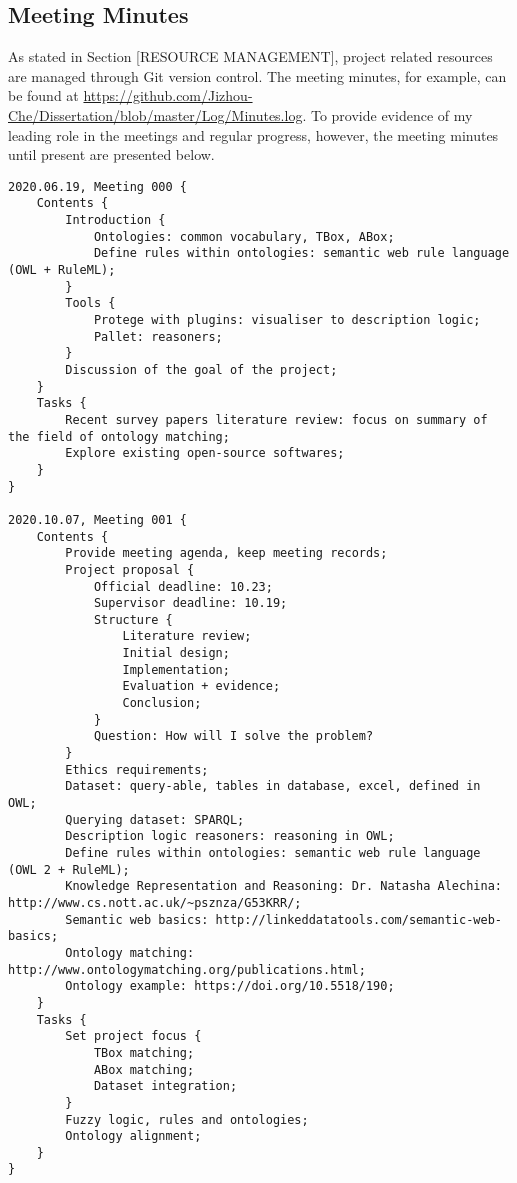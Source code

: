 \begin{appendices}


\chapter{Meeting Minutes}

As stated in Section [RESOURCE MANAGEMENT], project related resources are managed through Git version control. The meeting minutes, for example, can be found at \url{https://github.com/Jizhou-Che/Dissertation/blob/master/Log/Minutes.log}. To provide evidence of my leading role in the meetings and regular progress, however, the meeting minutes until present are presented below.
\\

\begin{spacing}{1.0}

\lstset{
basicstyle=\ttfamily\scriptsize,
showspaces=false,
showtabs=false,
breaklines,
tabsize=2
}

\begin{lstlisting}
2020.06.19, Meeting 000 {
	Contents {
		Introduction {
			Ontologies: common vocabulary, TBox, ABox;
			Define rules within ontologies: semantic web rule language (OWL + RuleML);
		}
		Tools {
			Protege with plugins: visualiser to description logic;
			Pallet: reasoners;
		}
		Discussion of the goal of the project;
	}
	Tasks {
		Recent survey papers literature review: focus on summary of the field of ontology matching;
		Explore existing open-source softwares;
	}
}

2020.10.07, Meeting 001 {
	Contents {
		Provide meeting agenda, keep meeting records;
		Project proposal {
			Official deadline: 10.23;
			Supervisor deadline: 10.19;
			Structure {
				Literature review;
				Initial design;
				Implementation;
				Evaluation + evidence;
				Conclusion;
			}
			Question: How will I solve the problem?
		}
		Ethics requirements;
		Dataset: query-able, tables in database, excel, defined in OWL;
		Querying dataset: SPARQL;
		Description logic reasoners: reasoning in OWL;
		Define rules within ontologies: semantic web rule language (OWL 2 + RuleML);
		Knowledge Representation and Reasoning: Dr. Natasha Alechina: http://www.cs.nott.ac.uk/~psznza/G53KRR/;
		Semantic web basics: http://linkeddatatools.com/semantic-web-basics;
		Ontology matching: http://www.ontologymatching.org/publications.html;
		Ontology example: https://doi.org/10.5518/190;
	}
	Tasks {
		Set project focus {
			TBox matching;
			ABox matching;
			Dataset integration;
		}
		Fuzzy logic, rules and ontologies;
		Ontology alignment;
	}
}


\end{lstlisting}
\end{spacing}
\end{appendices}
